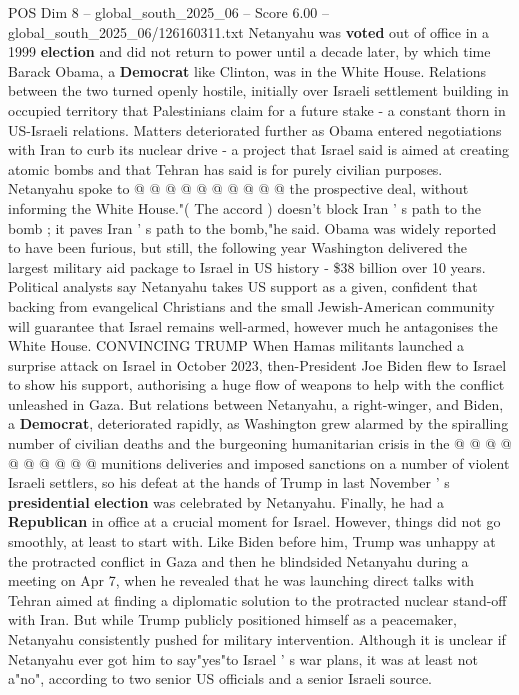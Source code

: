 \begin{textsample}{POS Dim 8 – global\_south\_2025\_06 – Score 6.00 – global\_south\_2025\_06/126160311.txt}
Netanyahu was \textbf{voted} out of office in a 1999 \textbf{election} and did not return to power until a decade later, by which time Barack Obama, a \textbf{Democrat} like Clinton, was in the White House.
Relations between the two turned openly hostile, initially over Israeli settlement building in occupied territory that Palestinians claim for a future stake - a constant thorn in US-Israeli relations.
Matters deteriorated further as Obama entered negotiations with Iran to curb its nuclear drive - a project that Israel said is aimed at creating atomic bombs and that Tehran has said is for purely civilian purposes.
Netanyahu spoke to @ @ @ @ @ @ @ @ @ @ the prospective deal, without informing the White House."( The accord ) doesn't block Iran ' s path to the bomb ; it paves Iran ' s path to the bomb,"he said.
Obama was widely reported to have been furious, but still, the following year Washington delivered the largest military aid package to Israel in US history - \$38 billion over 10 years.
Political analysts say Netanyahu takes US support as a given, confident that backing from evangelical Christians and the small Jewish-American community will guarantee that Israel remains well-armed, however much he antagonises the White House.
CONVINCING TRUMP When Hamas militants launched a surprise attack on Israel in October 2023, then-President Joe Biden flew to Israel to show his support, authorising a huge flow of weapons to help with the conflict unleashed in Gaza.
But relations between Netanyahu, a right-winger, and Biden, a \textbf{Democrat}, deteriorated rapidly, as Washington grew alarmed by the spiralling number of civilian deaths and the burgeoning humanitarian crisis in the @ @ @ @ @ @ @ @ @ @ munitions deliveries and imposed sanctions on a number of violent Israeli settlers, so his defeat at the hands of Trump in last November ' s \textbf{presidential} \textbf{election} was celebrated by Netanyahu.
Finally, he had a \textbf{Republican} in office at a crucial moment for Israel.
However, things did not go smoothly, at least to start with.
Like Biden before him, Trump was unhappy at the protracted conflict in Gaza and then he blindsided Netanyahu during a meeting on Apr 7, when he revealed that he was launching direct talks with Tehran aimed at finding a diplomatic solution to the protracted nuclear stand-off with Iran.
But while Trump publicly positioned himself as a peacemaker, Netanyahu consistently pushed for military intervention.
Although it is unclear if Netanyahu ever got him to say"yes"to Israel ' s war plans, it was at least not a"no", according to two senior US officials and a senior Israeli source.

\end{textsample}

